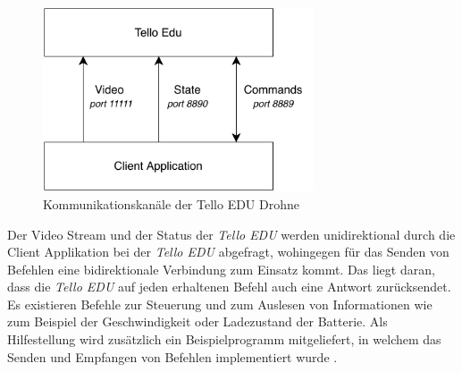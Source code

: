 \begin{figure}[H]
	\begin{center}
		\includegraphics[width=8cm]{Bilder/communication_tello.pdf} 
		\caption{Kommunikationskanäle der Tello EDU Drohne}
		\label{communication_tello}
	\end{center}
\end{figure}

Der Video Stream und der Status der \textit{Tello EDU} werden unidirektional durch die Client Applikation bei der \textit{Tello EDU} abgefragt, wohingegen für das Senden von Befehlen eine bidirektionale Verbindung zum Einsatz kommt. Das liegt daran, dass die \textit{Tello EDU} auf jeden erhaltenen Befehl auch eine Antwort zurücksendet. Es existieren Befehle zur Steuerung und zum Auslesen von Informationen wie zum Beispiel der Geschwindigkeit oder Ladezustand der Batterie. Als Hilfestellung wird zusätzlich ein Beispielprogramm mitgeliefert, in welchem das Senden und Empfangen von Befehlen implementiert wurde \cite{RyzeTech.2018}. 